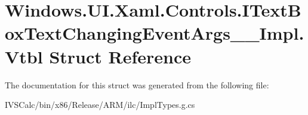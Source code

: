 \hypertarget{struct_windows_1_1_u_i_1_1_xaml_1_1_controls_1_1_i_text_box_text_changing_event_args_____impl_1_1_vtbl}{}\section{Windows.\+U\+I.\+Xaml.\+Controls.\+I\+Text\+Box\+Text\+Changing\+Event\+Args\+\_\+\+\_\+\+Impl.\+Vtbl Struct Reference}
\label{struct_windows_1_1_u_i_1_1_xaml_1_1_controls_1_1_i_text_box_text_changing_event_args_____impl_1_1_vtbl}


The documentation for this struct was generated from the following file\+:\begin{DoxyCompactItemize}
\item 
I\+V\+S\+Calc/bin/x86/\+Release/\+A\+R\+M/ilc/Impl\+Types.\+g.\+cs\end{DoxyCompactItemize}
